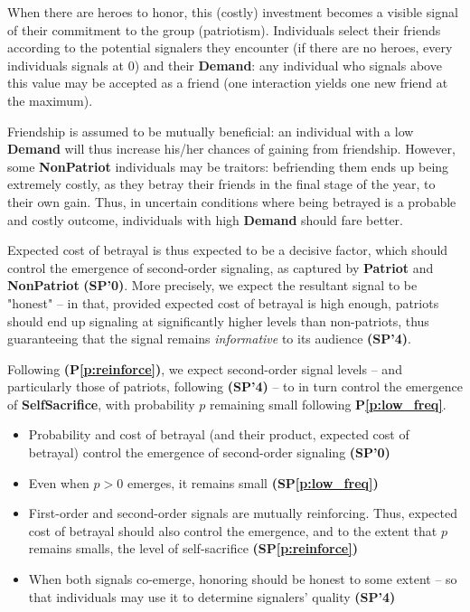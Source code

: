 \documentclass[a4paper,12pt]{report}
\begin{document}
When there are heroes to honor, this (costly) investment becomes a
visible signal of their commitment to the group (patriotism).
Individuals select their friends according to the potential
signalers they encounter (if there are no heroes, every individuals
signals at 0) and their \textbf{Demand}: any individual who signals above this
value may be accepted as a friend (one interaction yields one new friend at the maximum).

Friendship is assumed to be mutually beneficial:
an individual with a low \textbf{Demand}
will thus increase his/her chances of gaining from friendship.
However, some \textbf{NonPatriot} individuals may be traitors:
befriending them ends up being extremely costly, as they betray their friends
in the final stage of the year, to their own gain.
Thus, in uncertain conditions where being betrayed is a probable and costly outcome,
individuals with high \textbf{Demand} should fare better.

Expected cost of betrayal is thus expected to be a decisive factor, which should
control the emergence of second-order signaling, as captured by 
\textbf{Patriot} and \textbf{NonPatriot} \textbf{(SP'0)}. More precisely,
we expect the resultant signal to be "honest" – in that,
provided expected cost of betrayal is high enough, patriots should end up
signaling at significantly higher levels than non-patriots, thus
guaranteeing that the signal remains \emph{informative} to its audience \textbf{(SP'4)}.

Following \textbf{(P\ref{p:reinforce})}, we expect second-order signal levels
– and particularly those of patriots, following \textbf{(SP'4)} –
to in turn control the emergence of \textbf{SelfSacrifice},
with probability $p$ remaining small following \textbf{P\ref{p:low_freq}}.

\begin{spe_predict*}
    \label{spe_p:sacri}
    \leavevmode
    \begin{itemize}
        \item Probability and cost of betrayal (and their product, expected cost
        of betrayal) control the emergence of second-order signaling \textbf{(SP'0)}
        \item Even when $p>0$ emerges, it remains small \textbf{(SP\ref{p:low_freq})}
        \item First-order and second-order signals are mutually reinforcing. Thus,
        expected cost of betrayal should also control the emergence, and to the extent
        that $p$ remains smalls, the level of self-sacrifice \textbf{(SP\ref{p:reinforce})}
        \item When both signals co-emerge, honoring should be honest to some extent
        – so that individuals may use it to determine signalers' quality \textbf{(SP'4)}
    \end{itemize}
\end{spe_predict*}
\end{document}
